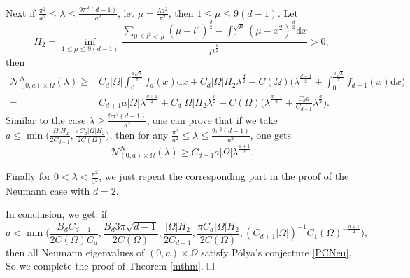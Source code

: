 \documentclass[11pt,letterpaper]{amsart}
\numberwithin{equation}{section}
\theoremstyle{plain}
\theoremstyle{plain}
\numberwithin{equation}{section}
\theoremstyle{remark}
\begin{document}
	Next if $\frac{\pi^2}{a^2}\le \lambda \le \frac{9\pi^2(d-1)}{a^2}$, let $\mu= \frac{\lambda a^2}{\pi^2}$, then $1\le \mu \le 9(d-1)$. Let
	\[
	H_2= \inf_{1\le \mu\le 9(d-1)} \frac{\sum_{0\le l^2< \mu} (\mu- l^2)^{\frac{d}{2}}- \int_0^{\sqrt\mu} (\mu- x^2)^{\frac{d}{2}} \mathrm{d}x}{\mu^{\frac{d}{2}}}>0,
	\]
	then   
	\[
	\begin{aligned}
		\mathcal{N}^N_{(0,a)\times \Omega}(\lambda)
		\ge &C_d|\Omega| \int_0^{\frac{a\sqrt\lambda}{\pi}}\!\!\! f_d(x) \mathrm{d}x+ C_d|\Omega|H_2\lambda^{\frac{d}{2}}- C(\Omega)\big(\lambda^{\frac{d-1}{2}}+ \int_0^{{\frac{a\sqrt\lambda}{\pi}}}\!\!\! f_{d-1}(x)\mathrm d x\big)\\
		=   &C_{d+1}a|\Omega|\lambda^{\frac{d+1}{2}}+ C_d|\Omega|H_2\lambda^{\frac{d}{2}}- C(\Omega)\big(\lambda^{\frac{d-1}{2}}+ \frac{C_d a}{C_{d-1}}\lambda^{\frac{d}{2}}\big).
	\end{aligned}
	\]
	Similar to the case $\lambda\ge \frac{9\pi^2(d-1)}{a^2}$, one can prove that if we take 
	$a\le \min\big(\frac{|\Omega|H_2}{2C_{d-1}}, \frac{\pi C_d|\Omega|H_2}{2 C(\Omega)}\big)$,   
	then for any $\frac{\pi^2}{a^2}\le \lambda \le \frac{9\pi^2(d-1)}{a^2}$, one gets  
	\[
	\mathcal{N}^N_{(0,a)\times \Omega}(\lambda)\ge C_{d+1}a |\Omega|\lambda^{\frac{d+1}{2}}.
	\]
	
	Finally for $0< \lambda< \frac{\pi^2}{a^2}$, we just repeat the corresponding part in the proof of the Neumann case with $d=2$.

	In conclusion, we   get: if
	\[
	a< \min\bigg(\frac{B_d C_{d-1}}{2C(\Omega) C_d}, \frac{B_d3\pi\sqrt{d-1}}{2C(\Omega)},\frac{|\Omega|H_2}{2C_{d-1}}, \frac{\pi C_d|\Omega|H_2}{2 C(\Omega)}, (C_{d+1}|\Omega|)^{-1} C_1(\Omega)^{-\frac{d+1}{2}}\bigg),
	\]
	then all Neumann eigenvalues of $(0,a)\times \Omega$ satisfy   P\'olya's conjecture \eqref{PCNeu}. So we complete the proof of Theorem \ref{mthm}. $\hfill\square$
	
\end{document}
